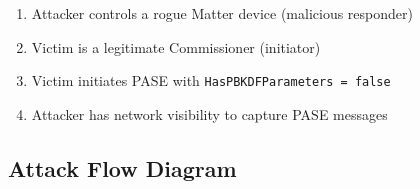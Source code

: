 \documentclass[11pt,a4paper]{article}
\begin{document}
\begin{infobox}
\begin{enumerate}
    \item Attacker controls a rogue Matter device (malicious responder)
    \item Victim is a legitimate Commissioner (initiator)
    \item Victim initiates PASE with \texttt{HasPBKDFParameters = false}
    \item Attacker has network visibility to capture PASE messages
\end{enumerate}
\end{infobox}

\subsection{Attack Flow Diagram}
\end{document}
